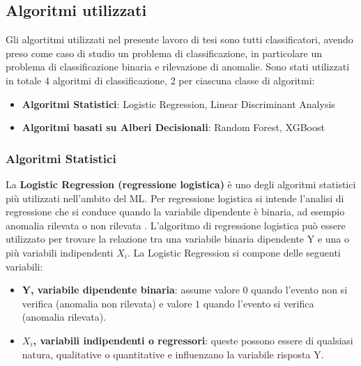 \subsection{Algoritmi utilizzati}
Gli algortitmi utilizzati nel presente lavoro di tesi sono tutti classificatori, avendo preso come caso di studio un problema di classificazione, in particolare un problema di classificazione binaria e rilevazione di anomalie. Sono stati utilizzati in totale 4 algoritmi di classificazione, 2 per ciascuna classe di algoritmi:

\begin{itemize}

  \item \textbf{Algoritmi Statistici}: Logistic Regression, Linear Discriminant Analysis
  
  \item \textbf{Algoritmi basati su Alberi Decisionali}: Random Forest, XGBoost
    
\end{itemize}


\subsubsection{Algoritmi Statistici}
La \textbf{Logistic Regression (regressione logistica)} \`e uno degli algoritmi statistici pi\`u utilizzati nell'ambito del ML. Per regressione logistica si intende l'analisi di regressione che si conduce quando la variabile dipendente \`e binaria, ad esempio anomalia rilevata o non rilevata \cite{lr_rf}. L'algoritmo di regressione logistica pu\`o essere utilizzato per trovare la relazione tra una variabile binaria dipendente Y e una o pi\`u variabili indipendenti $X_{i}$. La Logistic Regression si compone delle seguenti variabili:
\begin{itemize}

  \item \textbf{Y, variabile dipendente binaria}: assume valore $0$ quando l'evento non si verifica (anomalia non rilevata) e valore $1$ quando l'evento si verifica (anomalia rilevata).
  
  \item \textbf{$X_{i}$, variabili indipendenti o regressori}: queste possono essere di qualsiasi natura, qualitative o quantitative e influenzano la variabile risposta Y.
    
\end{itemize}

\vspace{0.5cm}

